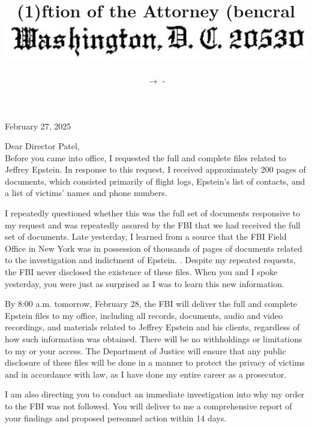 \documentclass[10pt]{article}
\title{(1)ftion of the Attorney (bencral \\
 \includegraphics[max width=\textwidth]{2025_02_27_dd68c3d38de88f0516d9g-001(1)} }
\author{\(\rightarrow\) -}
\date{}
\begin{document}
\maketitle
February 27, 2025

Dear Director Patel,\\
Before you came into office, I requested the full and complete files related to Jeffrey Epstein. In response to this request, I received approximately 200 pages of documents, which consisted primarily of flight logs, Epstein's list of contacts, and a list of victims' names and phone numbers.

I repeatedly questioned whether this was the full set of documents responsive to my request and was repeatedly assured by the FBI that we had received the full set of documents. Late yesterday, I learned from a source that the FBI Field Office in New York was in possession of thousands of pages of documents related to the investigation and indictment of Epstein. . Despite my repeated requests, the FBI never disclosed the existence of these files. When you and I spoke yesterday, you were just as surprised as I was to learn this new information.

By 8:00 a.m. tomorrow, February 28, the FBI will deliver the full and complete Epstein files to my office, including all records, documents, audio and video recordings, and materials related to Jeffrey Epstein and his clients, regardless of how such information was obtained. There will be no withholdings or limitations to my or your access. The Department of Justice will ensure that any public disclosure of these files will be done in a manner to protect the privacy of victims and in accordance with law, as I have done my entire career as a prosecutor.

I am also directing you to conduct an immediate investigation into why my order to the FBI was not followed. You will deliver to me a comprehensive report of your findings and proposed personnel action within 14 days.
\end{document}
